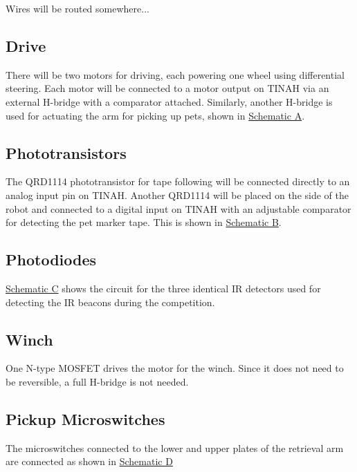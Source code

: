 \documentclass[11pt, oneside]{article} %
\begin{document}
Wires will be routed somewhere...

	\subsection{Drive}
	
	There will be two motors for driving, each powering one wheel using differential steering. Each motor will be connected to a motor output on TINAH via an external H-bridge with a comparator attached. Similarly, another H-bridge is used for actuating the arm for picking up pets, shown in \hyperref[sch:A]{Schematic A}.
	
	\subsection{Phototransistors}
	
	The QRD1114 phototransistor for tape following will be connected directly to an analog input pin on TINAH. Another QRD1114 will be placed on the side of the robot and connected to a digital input on TINAH with an adjustable comparator for detecting the pet marker tape. This is shown in \hyperref[sch:B]{Schematic B}.
	
	\subsection{Photodiodes}
	
	\hyperref[sch:C]{Schematic C} shows the circuit for the three identical IR detectors used for detecting the IR beacons during the competition.
	
	\subsection{Winch}
	
	One N-type MOSFET drives the motor for the winch. Since it does not need to be reversible, a full H-bridge is not needed.
	
	\subsection{Pickup Microswitches}
	
	The microswitches connected to the lower and upper plates of the retrieval arm are connected as shown in \hyperref[sch:E]{Schematic D}
	
\end{document}
